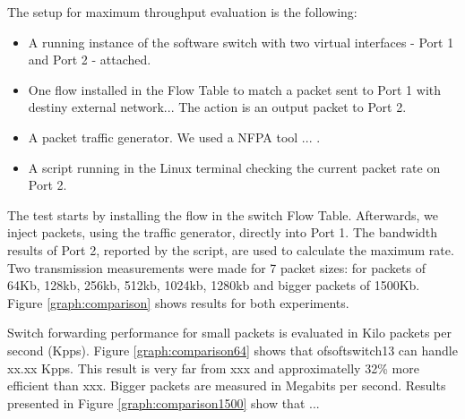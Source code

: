     The setup for maximum throughput evaluation is the following:
    
    \begin{itemize}
    \item A running instance of the software switch with two virtual interfaces - Port 1 and Port 2 - attached. 
    \item One flow installed in the Flow Table to match a packet sent to Port 1 with destiny external network... The action is an output packet to Port 2. 
    \item A packet traffic generator. We used a NFPA tool  \cite{packeth}... .
    \item A script running in the Linux terminal checking the current packet rate on Port 2.   
    \end{itemize}
    
    The test starts by installing the flow in the switch Flow Table. Afterwards, we inject packets, using the traffic generator, directly into Port 1. The bandwidth results of Port 2, reported by the script, are used to calculate the maximum rate.  
    Two transmission measurements were made for 7 packet sizes: for packets of 64Kb, 128kb, 256kb, 512kb, 1024kb, 1280kb and bigger packets of 1500Kb. Figure \ref{graph:comparison} shows results for both experiments.

    
   Switch forwarding performance for small packets is evaluated in Kilo packets per second (Kpps). Figure \ref{graph:comparison64} shows that ofsoftswitch13 can handle xx.xx Kpps. This result is very 
   far from xxx and approximatelly 32\% more efficient than xxx. Bigger packets are measured in Megabits per second. Results presented in Figure \ref{graph:comparison1500} show that ... 
   
        
   
    
